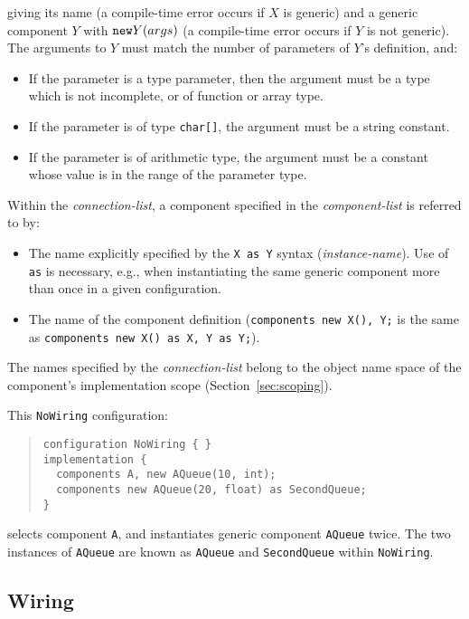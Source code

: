 \documentclass[11pt,letterpaper]{article}
\newcommand{\kw}[1]{{\tt #1}}
\newcommand{\code}[1]{{\tt #1}}
\begin{document}
giving its name (a compile-time error occurs if $X$ is generic) and
a generic component $Y$ with $\kw{new} Y(args)$ (a compile-time error occurs
if $Y$ is not generic). The arguments to $Y$ must match the number of
parameters of $Y$'s definition, and:
\begin{itemize}
\item If the parameter is a type parameter, then the argument must be
a type which is not incomplete, or of function or array type.
\item If the parameter is of type \code{char[]}, the argument must be
a string constant.
\item If the parameter is of arithmetic type, the argument must be a 
constant whose value is in the range of the parameter type.
\end{itemize}

Within the \emph{connection-list}, a component specified in the 
\emph{component-list} is referred to by:
\begin{itemize}
\item The name explicitly specified by the \code{X as Y} syntax
(\emph{instance-name}). Use of \kw{as} is necessary, e.g., when
instantiating the same generic component more than once in a given
configuration.
\item The name of the component definition (\code{components new X(), Y;} is
the same as \code{components new X() as X, Y as Y;}).
\end{itemize}
The names specified by the \emph{connection-list} belong to the object name
space of the component's implementation scope (Section~\ref{sec:scoping}).

This \code{NoWiring} configuration:
\begin{quote}
\begin{verbatim}
configuration NoWiring { }
implementation {
  components A, new AQueue(10, int);
  components new AQueue(20, float) as SecondQueue;
}
\end{verbatim}
\end{quote}
selects component \code{A}, and instantiates generic component
\code{AQueue} twice. The two instances of \code{AQueue} are known as
\code{AQueue} and \code{SecondQueue} within \code{NoWiring}.

\subsection{Wiring}
\label{sec:wiring}
\end{document}
